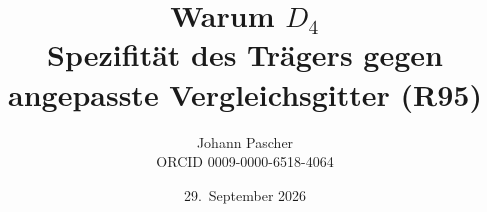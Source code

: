 \documentclass[11pt,a4paper]{report}
\title{Warum $D_4$\\[0.5em]
  \large Spezifität des Trägers gegen angepasste Vergleichsgitter (R95)}
\date{29.~September 2026}
\author{Johann Pascher\\\small ORCID 0009-0000-6518-4064}
\begin{document}
\renewcommand{\thechapter}{}
\renewcommand{\thesection}{\arabic{section}}
\maketitle
\tableofcontents

\end{document}

